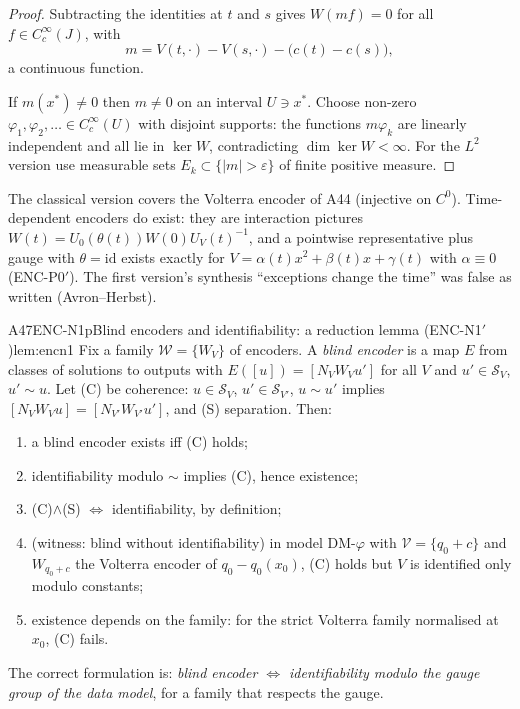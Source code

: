 \begin{proof}
Subtracting the identities at $t$ and $s$ gives $W(mf)=0$ for all $f\in C_c^\infty(J)$, with
\[
m=V(t,\cdot)-V(s,\cdot)-\big(c(t)-c(s)\big),
\]
a continuous function.

If $m(x^*)\ne0$ then $m\ne0$ on an interval $U\ni x^*$. Choose non-zero $\varphi_1,\varphi_2,\dots\in C_c^\infty(U)$ with disjoint supports: the functions $m\varphi_k$ are linearly independent and all lie in $\ker W$, contradicting $\dim\ker W<\infty$. For the $L^2$ version use measurable sets $E_k\subset\{|m|>\varepsilon\}$ of finite positive measure.

\end{proof}

\begin{caution}[title=Scope]
The classical version covers the Volterra encoder of A44 (injective on $C^0$). Time-dependent encoders do exist: they are interaction pictures $W(t)=U_0(\theta(t))W(0)U_V(t)^{-1}$, and a pointwise representative plus gauge with $\theta=\mathrm{id}$ exists exactly for $V=\alpha(t)x^2+\beta(t)x+\gamma(t)$ with $\alpha\equiv0$ (ENC-P0$'$). The first version's synthesis ``exceptions change the time'' was false as written (Avron--Herbst).
\end{caution}

\begin{dimcard}{A47}{ENC-N1p}{Blind encoders and identifiability: a reduction lemma (ENC-N1$'$)}{\proved}{lem:encn1}
Fix a family $\mathcal W=\{W_V\}$ of encoders. A \emph{blind encoder} is a map $E$ from classes of solutions to outputs with $E([u])=[N_VW_Vu']$ for all $V$ and $u'\in\mathcal S_V$, $u'\sim u$. Let (C) be coherence: $u\in\mathcal S_V$, $u'\in\mathcal S_{V'}$, $u\sim u'$ implies $[N_VW_Vu]=[N_{V'}W_{V'}u']$, and (S) separation. Then:
\begin{enumerate}[label=(\roman*)]
\item a blind encoder exists iff (C) holds;
\item identifiability modulo $\sim$ implies (C), hence existence;
\item (C)$\wedge$(S) $\iff$ identifiability, by definition;
\item (witness: blind without identifiability) in model DM-$\varphi$ with $\mathcal V=\{q_0+c\}$ and $W_{q_0+c}$ the Volterra encoder of $q_0-q_0(x_0)$, (C) holds but $V$ is identified only modulo constants;
\item existence depends on the family: for the strict Volterra family normalised at $x_0$, (C) fails.
\end{enumerate}
The correct formulation is: \emph{blind encoder $\iff$ identifiability modulo the gauge group of the data model}, for a family that respects the gauge.
\end{dimcard}

